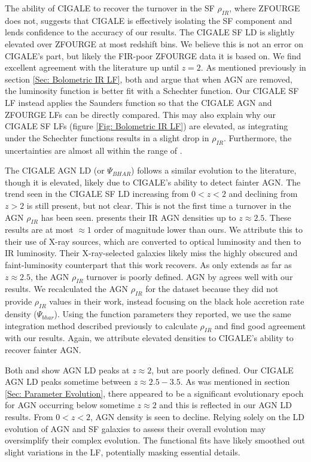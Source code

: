 The ability of CIGALE to recover the turnover in the SF $\rho_{IR}$, where ZFOURGE does not, suggests that CIGALE is effectively isolating the SF component and lends confidence to the accuracy of our results. The CIGALE SF LD is slightly elevated over ZFOURGE at most redshift bins. We believe this is not an error on CIGALE's part, but likely the FIR-poor ZFOURGE data it is based on. We find excellent agreement with the literature up until $z=2$. As mentioned previously in section \ref{Sec: Bolometric IR LF}, both \cite{fu_decomposing_2010} and \cite{wu_mid-infrared_2011} argue that when AGN are removed, the luminosity function is better fit with a Schechter function. Our CIGALE SF LF instead applies the Saunders function so that the CIGALE AGN and ZFOURGE LFs can be directly compared. This may also explain why our CIGALE SF LFs (figure \ref{Fig: Bolometric IR LF}) are elevated, as integrating under the Schechter functions results in a slight drop in $\rho_{IR}$. Furthermore, the uncertainties are almost all within the range of \cite{madau_cosmic_2014}.

The CIGALE AGN LD (or $\Psi_{BHAR}$) follows a similar evolution to the literature, though it is elevated, likely due to CIGALE's ability to detect fainter AGN. The trend seen in the CIGALE SF LD increasing from $0<z<2$ and declining from $z>2$ is still present, but not clear. This is not the first time a turnover in the AGN $\rho_{IR}$ has been seen. \cite{symeonidis_agn_2021} presents their IR AGN densities up to $z\approx2.5$. These results are at most $\approx 1$ order of magnitude lower than ours. We attribute this to their use of \cite{aird_evolution_2015} X-ray sources, which are converted to optical luminosity and then to IR luminosity. Their X-ray-selected galaxies likely miss the highly obscured and faint-luminosity counterpart that this work recovers. As \cite{symeonidis_agn_2021} only extends as far as $z\approx2.5$, the AGN $\rho_{IR}$ turnover is poorly defined. AGN by \cite{delvecchio_tracing_2014} agrees well with our results. We recalculated the AGN $\rho_{IR}$ for the \cite{delvecchio_tracing_2014} dataset because they did not provide $\rho_{IR}$ values in their work, instead focusing on the black hole accretion rate density ($\Psi_{bhar}$). Using the function parameters they reported, we use the same integration method described previously to calculate $\rho_{IR}$ and find good agreement with our results. Again, we attribute elevated densities to CIGALE's ability to recover fainter AGN.

Both \cite{symeonidis_agn_2021} and \cite{delvecchio_tracing_2014} show AGN LD peaks at $z\approx2$, but are poorly defined. Our CIGALE AGN LD peaks sometime between $z\approx2.5-3.5$. As was mentioned in section \ref{Sec: Parameter Evolution}, there appeared to be a significant evolutionary epoch for AGN occurring below sometime $z\approx2$ and this is reflected in our AGN LD results. From $0<z<2$, AGN density is seen to decline. Relying solely on the LD evolution of AGN and SF galaxies to assess their overall evolution may oversimplify their complex evolution. The functional fits have likely smoothed out slight variations in the LF, potentially masking essential details. 


